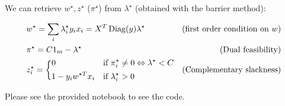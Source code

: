 \documentclass{article}
\begin{document}
We can retrieve $w^\star, z^\star$ ($\pi^\star$) from $\lambda^\star$ (obtained with the barrier method):

\begin{equation*}
    \begin{aligned}
         & w^\star = \sum_i \lambda^\star_i y_i x_i = X^T \operatorname{Diag}(y) \lambda^\star & \text{(first order condition on $w$)} \\
         & \pi^\star = C1_m - \lambda^\star                                      & \text{(Dual feasibility)}             \\
         & z_i^\star = \bigg\{\begin{aligned}
             & 0                       &  & \text{if } \pi_i^\star \ne 0 \Leftrightarrow \lambda^\star < C \\
             & 1 - y_i w^{\star T} x_i &  & \text{if } \lambda_i^\star > 0                                 \\
        \end{aligned}                         & \text{(Complementary slackness)}      \\
    \end{aligned}
\end{equation*}


Please see the provided notebook to see the code.
\end{document}
